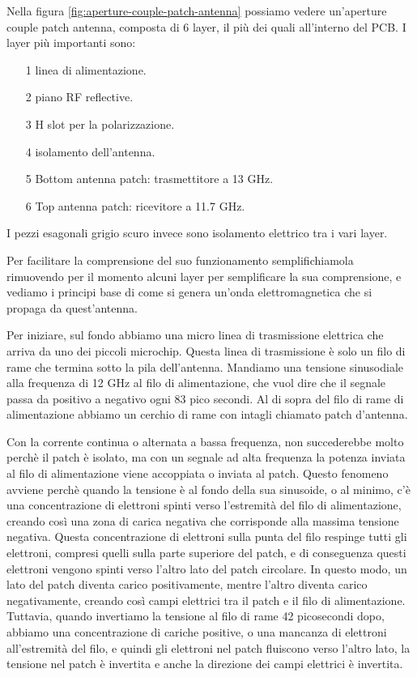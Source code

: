 Nella figura \ref{fig:aperture-couple-patch-antenna} possiamo vedere un'aperture couple patch antenna, composta di 6 layer, il più dei quali all'interno del PCB.
I layer più importanti sono:
\begin{itemize}
  \item[1] linea di alimentazione.
  \item[2] piano RF reflective.
  \item[3] H slot per la polarizzazione.
  \item[4] isolamento dell'antenna.
  \item[5] Bottom antenna patch: trasmettitore a 13 GHz.
  \item[6] Top antenna patch: ricevitore a 11.7 GHz.
\end{itemize}
I pezzi esagonali grigio scuro invece sono isolamento elettrico tra i vari layer.\cite{branch_education_how_2022}

Per facilitare la comprensione del suo funzionamento semplifichiamola rimuovendo per il momento alcuni layer per semplificare la sua comprensione, e vediamo i principi base di come si genera un'onda elettromagnetica che si propaga da quest'antenna.

Per iniziare, sul fondo abbiamo una micro linea di trasmissione elettrica che arriva da uno dei piccoli microchip.
Questa linea di trasmissione è solo un filo di rame che termina sotto la pila dell'antenna.
Mandiamo una tensione sinusodiale alla frequenza di 12 GHz al filo di alimentazione, che vuol dire che il segnale passa da positivo a negativo ogni 83 pico secondi.
Al di sopra del filo di rame di alimentazione abbiamo un cerchio di rame con intagli chiamato patch d'antenna.

Con la corrente continua o alternata a bassa frequenza, non succederebbe molto perchè il patch è isolato, ma con un segnale ad alta frequenza la potenza inviata al filo di alimentazione viene accoppiata o inviata al patch.
Questo fenomeno avviene perchè quando la tensione è al fondo della sua sinusoide, o al minimo, c'è una concentrazione di elettroni spinti verso l'estremità del filo di alimentazione, creando così una zona di carica negativa che corrisponde alla massima tensione negativa.
Questa concentrazione di elettroni sulla punta del filo respinge tutti gli elettroni, compresi quelli sulla parte superiore del patch, e di conseguenza questi elettroni vengono spinti verso l'altro lato del patch circolare.
In questo modo, un lato del patch diventa carico positivamente, mentre l'altro diventa carico negativamente, creando così campi elettrici tra il patch e il filo di alimentazione.
Tuttavia, quando invertiamo la tensione al filo di rame 42 picosecondi dopo, abbiamo una concentrazione di cariche positive, o una mancanza di elettroni all'estremità del filo, e quindi gli elettroni nel patch fluiscono verso l'altro lato, la tensione nel patch è invertita e anche la direzione dei campi elettrici è invertita.\cite{branch_education_how_2022}

